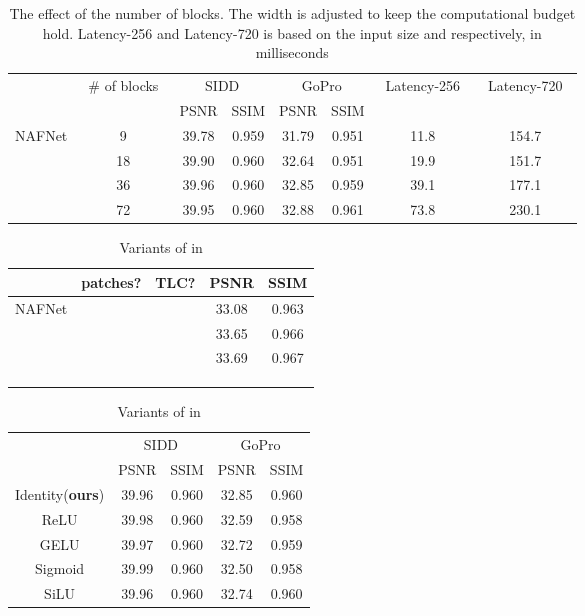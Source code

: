 \documentclass[runningheads]{llncs}
\begin{document}
\begin{table}
\begin{center}
\caption{The effect of the number of blocks. The width is adjusted to keep the computational budget hold. Latency-256 and Latency-720 is based on the input size  and  respectively, in milliseconds}
\label{tab:ablation-num_of_blk}
\begin{tabular}{c|c|cc|cc|c|c}
\hline
 & \multirow{2}{*}{\ \# of blocks\ } &  \multicolumn{2}{|c|}{SIDD} & \multicolumn{2}{|c|}{GoPro} & \multirow{2}{*}{\ Latency-256\ } &\multirow{2}{*}{\ Latency-720\ }\\
  & & PSNR & SSIM & PSNR & SSIM &&\\
  \hline
\multirow{4}{*}{NAFNet} & 9 & 39.78 & 0.959 & 31.79 & 0.951 & 11.8 &154.7  \\
 & 18 & 39.90 & 0.960 & 32.64 & 0.951 & 19.9 &151.7  \\
 & 36  & 39.96 & 0.960 & 32.85 & 0.959 &39.1 &177.1  \\
 & 72 & 39.95 & 0.960 & 32.88 & 0.961 &73.8 &230.1  \\
 \hline
\end{tabular}
\end{center}
\end{table}
\begin{table}[ht]
\RawFloats
\scriptsize
\setlength{\tabcolsep}{3pt}
    \parbox{.4\linewidth}{
\centering
\caption{Effectiveness of TLC\cite{chu2021revisiting} on GoPro\cite{nah2017deep}
}
 \label{tab:ablation-tlc}
    \begin{tabular}{lcccc}

\hline
 &{patches?} & {TLC?}  & {PSNR} & {SSIM} \\ 
\hline
\multirow{3}{*}{NAFNet}& & & 33.08 &0.963\\
& & & 33.65 &0.966\\
& & & 33.69 &0.967\\
\hline
& & & &\\
& & & &\\
& & & &\\
\end{tabular}}
\hfill    
\parbox{.58\linewidth}{
\centering
\caption{Variants of  in }
 \label{tab:ablation-variants_sigma}

\begin{tabular}{c|cc|cc}
\hline
  \multirow{2}{*}{} &  \multicolumn{2}{|c|}{SIDD} & \multicolumn{2}{|c}{GoPro} \\
   & PSNR & SSIM & PSNR & SSIM \\
  \hline
 Identity(\textbf{ours}) & 39.96 & 0.960 & 32.85 & 0.960\\
  ReLU & 39.98 & 0.960 & 32.59 & 0.958  \\
  GELU  & 39.97 & 0.960 & 32.72 & 0.959   \\
  Sigmoid & 39.99 & 0.960 & 32.50 & 0.958   \\
  SiLU & 39.96 & 0.960 & 32.74 & 0.960   \\
 \hline
\end{tabular}
}
\end{table}
\end{document}
